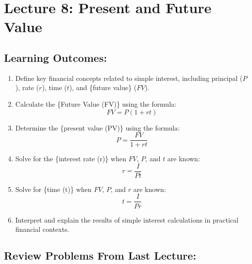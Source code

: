\documentclass[
]{book}
\providecommand{\tightlist}{%
  \setlength{\itemsep}{0pt}\setlength{\parskip}{0pt}}
\begin{document}
\section*{Lecture 8: Present and Future Value}\label{lecture-8-present-and-future-value}

\subsection*{Learning Outcomes:}\label{learning-outcomes-7}

\begin{enumerate}
\def\labelenumi{\arabic{enumi}.}
\tightlist
\item
  Define key financial concepts related to simple interest, including principal (\(P\)), rate (\(r\)), time (\(t\)), and \{future value\} (\(FV\)).
\item
  Calculate the \{Future Value (FV)\} using the formula:
  \[
   FV = P(1 + rt)
   \]
\item
  Determine the \{present value (PV)\} using the formula:
  \[
   P = \frac{FV}{1 + rt}
   \]
\item
  Solve for the \{interest rate (r)\} when \(FV\), \(P\), and \(t\) are known:
  \[
   r = \frac{I}{P t}
   \]
\item
  Solve for \{time (t)\} when \(FV\), \(P\), and \(r\) are known:
  \[
   t = \frac{I}{P r}
   \]
\item
  Interpret and explain the results of simple interest calculations in practical financial contexts.
\end{enumerate}

\subsection*{Review Problems From Last Lecture:}\label{review-problems-from-last-lecture-6}
\end{document}
